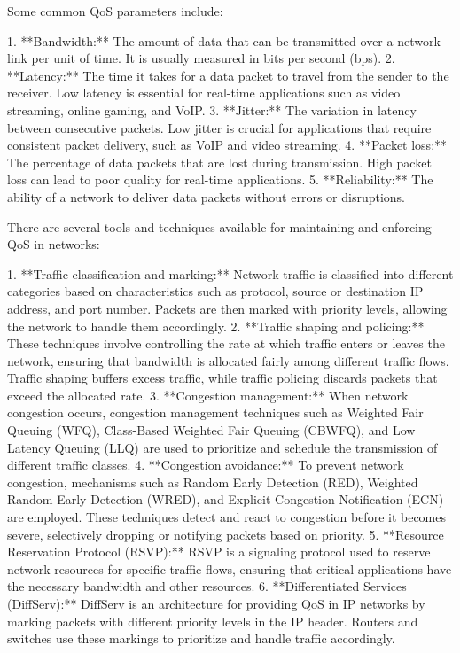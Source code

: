 \documentclass{article}
\begin{document}
Some common QoS parameters include:

1. **Bandwidth:** The amount of data that can be transmitted over a network link per unit of time. It is usually measured in bits per second (bps).
2. **Latency:** The time it takes for a data packet to travel from the sender to the receiver. Low latency is essential for real-time applications such as video streaming, online gaming, and VoIP.
3. **Jitter:** The variation in latency between consecutive packets. Low jitter is crucial for applications that require consistent packet delivery, such as VoIP and video streaming.
4. **Packet loss:** The percentage of data packets that are lost during transmission. High packet loss can lead to poor quality for real-time applications.
5. **Reliability:** The ability of a network to deliver data packets without errors or disruptions.

There are several tools and techniques available for maintaining and enforcing QoS in networks:

1. **Traffic classification and marking:** Network traffic is classified into different categories based on characteristics such as protocol, source or destination IP address, and port number. Packets are then marked with priority levels, allowing the network to handle them accordingly.
2. **Traffic shaping and policing:** These techniques involve controlling the rate at which traffic enters or leaves the network, ensuring that bandwidth is allocated fairly among different traffic flows. Traffic shaping buffers excess traffic, while traffic policing discards packets that exceed the allocated rate.
3. **Congestion management:** When network congestion occurs, congestion management techniques such as Weighted Fair Queuing (WFQ), Class-Based Weighted Fair Queuing (CBWFQ), and Low Latency Queuing (LLQ) are used to prioritize and schedule the transmission of different traffic classes.
4. **Congestion avoidance:** To prevent network congestion, mechanisms such as Random Early Detection (RED), Weighted Random Early Detection (WRED), and Explicit Congestion Notification (ECN) are employed. These techniques detect and react to congestion before it becomes severe, selectively dropping or notifying packets based on priority.
5. **Resource Reservation Protocol (RSVP):** RSVP is a signaling protocol used to reserve network resources for specific traffic flows, ensuring that critical applications have the necessary bandwidth and other resources.
6. **Differentiated Services (DiffServ):** DiffServ is an architecture for providing QoS in IP networks by marking packets with different priority levels in the IP header. Routers and switches use these markings to prioritize and handle traffic accordingly.
\end{document}
